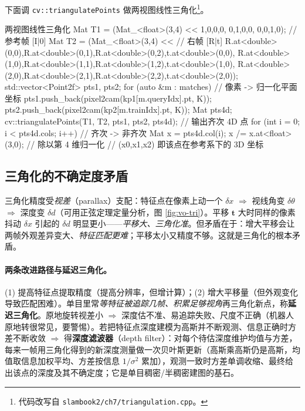 \begin{practice}
下面调 \texttt{cv::triangulatePoints} 做两视图线性三角化\footnote{代码改写自 \texttt{slambook2/ch7/triangulation.cpp}\cite{gaoxiang2019slam14}。}。
\begin{codebox}[C++]{两视图线性三角化}
Mat T1 = (Mat_<float>(3,4) << 1,0,0,0, 0,1,0,0, 0,0,1,0);   // 参考帧 [I|0]
Mat T2 = (Mat_<float>(3,4) <<                                  // 右帧 [R|t]
  R.at<double>(0,0),R.at<double>(0,1),R.at<double>(0,2),t.at<double>(0,0),
  R.at<double>(1,0),R.at<double>(1,1),R.at<double>(1,2),t.at<double>(1,0),
  R.at<double>(2,0),R.at<double>(2,1),R.at<double>(2,2),t.at<double>(2,0));
std::vector<Point2f> pts1, pts2;
for (auto &m : matches) {                 // 像素 -> 归一化平面坐标
  pts1.push_back(pixel2cam(kp1[m.queryIdx].pt, K));
  pts2.push_back(pixel2cam(kp2[m.trainIdx].pt, K));
}
Mat pts4d;
cv::triangulatePoints(T1, T2, pts1, pts2, pts4d);   // 输出齐次 4D 点
for (int i = 0; i < pts4d.cols; i++) {              // 齐次 -> 非齐次
  Mat x = pts4d.col(i);  x /= x.at<float>(3,0);     // 除以第 4 维归一化
  // (x0,x1,x2) 即该点在参考系下的 3D 坐标
}
\end{codebox}
\end{practice}

\subsection{三角化的不确定度矛盾}
\label{sec:vo-tri-uncertainty}

\begin{insight}[视差—深度不确定度矛盾]
三角化精度受\emph{视差}（parallax）支配\cite{gaoxiang2019slam14}：特征点在像素上动一个 $\delta x$ $\Rightarrow$ 视线角变 $\delta\theta$ $\Rightarrow$ 深度变 $\delta d$（可用正弦定理定量分析，图 \ref{fig:vo-tri}）。平移 $\mathbf{t}$ 大时同样的像素抖动 $\delta x$ 引起的 $\delta d$ 明显更小——\emph{平移大、三角化准}。但矛盾在于：增大平移会让两帧外观差异变大、\emph{特征匹配更难}；平移太小又精度不够。这就是三角化的根本矛盾。
\end{insight}

\paragraph{两条改进路径与延迟三角化\cite{gaoxiang2019slam14}。}
(1) 提高特征点提取精度（提高分辨率，但增计算）；(2) 增大平移量（但外观变化导致匹配困难）。单目里常\emph{等特征被追踪几帧、积累足够视角}再三角化新点，称\textbf{延迟三角化}。原地旋转视差小 $\Rightarrow$ 深度估不准、易追踪失败、尺度不正确（机器人原地转很常见，要警惕）。若把特征点深度建模为高斯并不断观测、信息正确时方差不断收敛 $\Rightarrow$ 得\textbf{深度滤波器}（depth filter）：对每个待估深度维护均值与方差，每来一帧用三角化得到的新深度测量做一次贝叶斯更新（高斯乘高斯仍是高斯，均值取信息加权平均、方差按信息 $1/\sigma^2$ 累加），观测一致时方差单调收缩、最终给出该点的深度及其不确定度；它是单目稠密/半稠密建图的基石。

